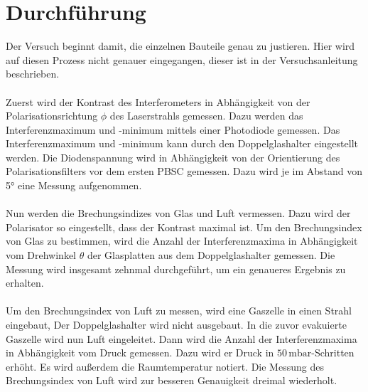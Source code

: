 \section{Durchführung}
\label{sec:Durchführung}
Der Versuch beginnt damit, die einzelnen Bauteile genau zu justieren. Hier wird auf diesen Prozess nicht genauer eingegangen, dieser ist in der Versuchsanleitung
\cite{ap64} beschrieben. \\
\\
Zuerst wird der Kontrast des Interferometers in Abhängigkeit von der Polarisationsrichtung $\phi$ des Laserstrahls gemessen. Dazu werden das Interferenzmaximum und -minimum
mittels einer Photodiode gemessen. Das Interferenzmaximum und -minimum kann durch den Doppelglashalter eingestellt werden.
Die Diodenspannung wird in Abhängigkeit von der Orientierung des Polarisationsfilters vor dem ersten PBSC gemessen. Dazu wird je im Abstand von 5° eine Messung aufgenommen.
\\
\\
Nun werden die Brechungsindizes von Glas und Luft vermessen. Dazu wird der Polarisator so eingestellt, dass der Kontrast maximal ist. 
Um den Brechungsindex von Glas zu bestimmen, wird die Anzahl der Interferenzmaxima in Abhängigkeit vom Drehwinkel 
$\theta$ der Glasplatten aus dem Doppelglashalter gemessen. Die Messung wird insgesamt zehnmal durchgeführt, um ein genaueres Ergebnis zu erhalten. \\
\\
Um den Brechungsindex von Luft zu messen, wird eine Gaszelle in einen Strahl eingebaut, 
Der Doppelglashalter wird nicht ausgebaut. In die zuvor evakuierte Gaszelle wird nun Luft eingeleitet. Dann wird die Anzahl der Interferenzmaxima in 
Abhängigkeit vom Druck gemessen. Dazu wird er Druck in $50\,\mathrm{mbar}$-Schritten erhöht. Es wird außerdem die Raumtemperatur notiert. Die Messung des Brechungsindex 
von Luft wird zur besseren Genauigkeit dreimal wiederholt.